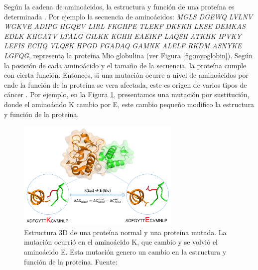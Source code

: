 Según la cadena de aminoácidos, la estructura y función de una proteína es determinada \citep{rastogi2022bioinformatics,kihara2017protein,rangwala2010introduction}. Por ejemplo la secuencia de aminoácidos: \textit{MGLS DGEWQ LVLNV WGKVE ADIPG HGQEV LIRL FKGHPE TLEKF DKFKH LKSE DEMKAS EDLK KHGATV LTALG GILKK KGHH EAEIKP LAQSH ATKHK IPVKY LEFIS ECIIQ VLQSK HPGD FGADAQ GAMNK ALELF RKDM ASNYKE LGFQG}, representa la proteína Mio globulina (ver Figura \ref{fig:myoglobin}). Según la posición de cada aminoácido y el tamaño de la secuencia, la proteína cumple con cierta función. Entonces, si una mutación ocurre a nivel de aminoácidos por ende la función de la proteína se vera afectada, este es origen de varios tipos de cáncer \citep{xie2023neoantigens,biswas2023designing}. Por ejemplo, en la Figura \ref{fig:mutabind}, presentamos  una mutación por sustitución, donde el aminoácido K cambio por E, este cambio pequeño modifico la estructura y función de la proteína.

\begin{figure}[H]
	\centering\includegraphics[width=0.7\textwidth]{../img/proposal/mutabind}
	\caption[Estructura 3D de una proteína normal y una proteína mutada]{Estructura 3D de una proteína normal y una proteína mutada. La mutación ocurrió en el aminoácido K, que cambio y se volvió el aminoácido E. Esta mutación genero un cambio en la estructura y función de la proteína. Fuente: \cite{mutabind2024}}
	\label{fig:mutabind}
\end{figure}

